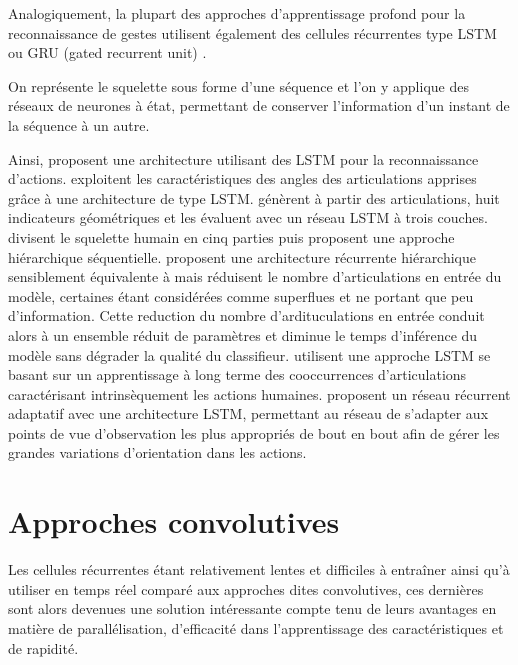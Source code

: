 Analogiquement, la plupart des approches d'apprentissage profond pour la reconnaissance de gestes utilisent également des cellules récurrentes type LSTM\\ \cite{hochreiter1997long} ou GRU (gated recurrent unit) \cite{2014arXiv1406.1078C}.

On représente le squelette sous forme d’une séquence et l'on y applique des réseaux de neurones à état, permettant de conserver l’information d’un instant de la séquence à un autre.

Ainsi, \cite{baccouche2011sequential} proposent une architecture utilisant des LSTM pour la reconnaissance d'actions.
 \cite{avola2018exploiting} exploitent les caractéristiques des angles des articulations apprises grâce à une architecture de type LSTM. 
\cite{zhang2017geometric} génèrent à partir des articulations, huit indicateurs géométriques et les évaluent avec un réseau LSTM à trois couches.
\cite{du2015hierarchical} divisent le squelette humain en cinq parties puis proposent une approche hiérarchique séquentielle.
\cite{shukla2017recurrent} proposent une architecture récurrente hiérarchique sensiblement équivalente à \cite{du2015hierarchical} mais réduisent le nombre d'articulations en entrée du modèle, certaines étant considérées comme superflues et ne portant que peu d'information. Cette reduction du nombre d'ardituculations en entrée conduit alors à un ensemble réduit de paramètres et diminue le temps d'inférence du modèle sans dégrader la qualité du classifieur.
\cite{shahroudy2016ntu} utilisent une approche LSTM se basant sur un apprentissage à long terme des cooccurrences d'articulations caractérisant intrinsèquement les actions humaines.
\cite{zhang2017view} proposent un réseau récurrent adaptatif avec une architecture LSTM, permettant au réseau de s'adapter aux points de vue d'observation les plus appropriés de bout en bout afin de gérer les grandes variations d'orientation dans les actions.

\section{Approches convolutives}
\label{partieconvolutive}
Les cellules récurrentes étant relativement lentes et difficiles à entraîner ainsi qu'à utiliser en temps réel comparé aux approches dites convolutives, ces dernières sont alors devenues une solution intéressante compte tenu de leurs avantages en matière de parallélisation, d'efficacité dans l'apprentissage des caractéristiques et de rapidité.


